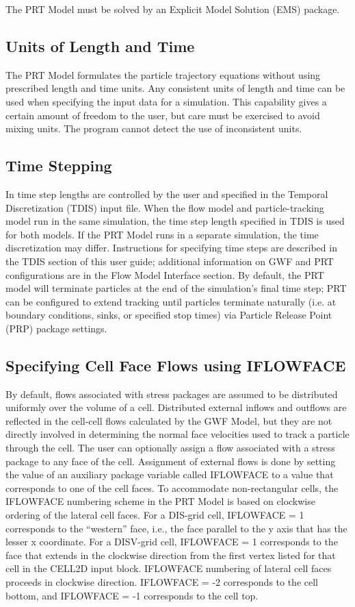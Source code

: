 The PRT Model must be solved by an Explicit Model Solution (EMS) package.

\subsection{Units of Length and Time}
The PRT Model formulates the particle trajectory equations without using prescribed length and time units. Any consistent units of length and time can be used when specifying the input data for a simulation. This capability gives a certain amount of freedom to the user, but care must be exercised to avoid mixing units.  The program cannot detect the use of inconsistent units.

\subsection{Time Stepping}
In \mf time step lengths are controlled by the user and specified in the Temporal Discretization (TDIS) input file.  When the flow model and particle-tracking model run in the same simulation, the time step length specified in TDIS is used for both models.  If the PRT Model runs in a separate simulation, the time discretization may differ.  Instructions for specifying time steps are described in the TDIS section of this user guide; additional information on GWF and PRT configurations are in the Flow Model Interface section.  By default, the PRT model will terminate particles at the end of the simulation's final time step; PRT can be configured to extend tracking until particles terminate naturally (i.e. at boundary conditions, sinks, or specified stop times) via Particle Release Point (PRP) package settings.

\subsection{Specifying Cell Face Flows using IFLOWFACE}

By default, flows associated with stress packages are assumed to be distributed uniformly over the volume of a cell. Distributed external inflows and outflows are reflected in the cell-cell flows calculated by the GWF Model, but they are not directly involved in determining the normal face velocities used to track a particle through the cell. The user can optionally assign a flow associated with a stress package to any face of the cell. Assignment of external flows is done by setting the value of an auxiliary package variable called IFLOWFACE to a value that corresponds to one of the cell faces. To accommodate non-rectangular cells, the IFLOWFACE numbering scheme in the PRT Model is based on clockwise ordering of the lateral cell faces. For a DIS-grid cell, IFLOWFACE = 1 corresponds to the ``western'' face, i.e., the face parallel to the y axis that has the lesser x coordinate. For a DISV-grid cell, IFLOWFACE = 1 corresponds to the face that extends in the clockwise direction from the first vertex listed for that cell in the CELL2D input block. IFLOWFACE numbering of lateral cell faces proceeds in clockwise direction. IFLOWFACE = -2 corresponds to the cell bottom, and IFLOWFACE = -1 corresponds to the cell top.

